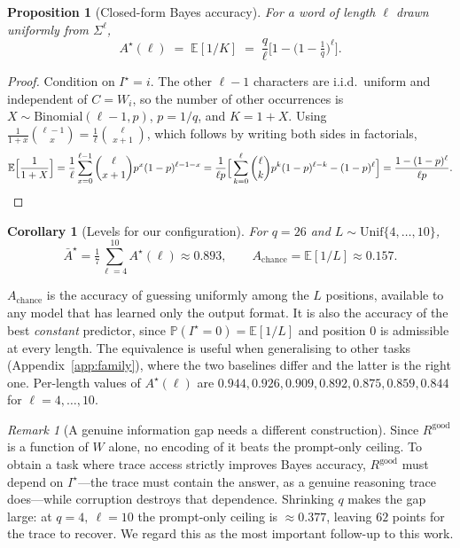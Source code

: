 \documentclass{article}
\theoremstyle{plain}
\newtheorem{proposition}{Proposition}
\newtheorem{corollary}{Corollary}
\theoremstyle{definition}
\theoremstyle{remark}
\newtheorem{remark}{Remark}
\newcommand{\E}{\mathbb{E}}
\newcommand{\Prob}{\mathbb{P}}
\newcommand{\1}{\mathbf{1}}
\newcommand{\good}{\mathrm{good}}
\begin{document}
\begin{proposition}[Closed-form Bayes accuracy]
\label{prop:bayesacc}
For a word of length $\ell$ drawn uniformly from $\Sigma^\ell$,
\begin{equation}
\label{eq:bayesacc}
A^\star(\ell) \;=\; \E[1/K] \;=\; \frac{q}{\ell}\Big[1 - \big(1-\tfrac1q\big)^{\ell}\Big].
\end{equation}
\end{proposition}

\begin{proof}
Condition on $I^\star = i$. The other $\ell-1$ characters are i.i.d.\ uniform and
independent of $C = W_i$, so the number of other occurrences is
$X\sim\mathrm{Binomial}(\ell-1,p)$, $p = 1/q$, and $K = 1+X$. Using
$\frac{1}{1+x}\binom{\ell-1}{x} = \frac1\ell\binom{\ell}{x+1}$, which follows by
writing both sides in factorials,
\[
\E\Big[\frac1{1+X}\Big]
= \frac1\ell\sum_{x=0}^{\ell-1}\binom{\ell}{x+1}p^{x}(1-p)^{\ell-1-x}
= \frac{1}{\ell p}\Big[\sum_{k=0}^{\ell}\binom{\ell}{k}p^{k}(1-p)^{\ell-k} - (1-p)^\ell\Big]
= \frac{1-(1-p)^{\ell}}{\ell p}.
\qedhere
\]
\end{proof}

\begin{corollary}[Levels for our configuration]
\label{cor:levels}
For $q = 26$ and $L\sim\mathrm{Unif}\{4,\dots,10\}$,
\begin{equation}
\label{eq:levels}
\bar A^\star = \tfrac17\textstyle\sum_{\ell=4}^{10} A^\star(\ell) \approx 0.893,
\qquad
A_{\mathrm{chance}} = \E[1/L] \approx 0.157 .
\end{equation}
\end{corollary}

$A_{\mathrm{chance}}$ is the accuracy of guessing uniformly among the $L$
positions, available to any model that has learned only the output format. It is
also the accuracy of the best \emph{constant} predictor, since
$\Prob(I^\star = 0) = \E[1/L]$ and position $0$ is admissible at every length.
The equivalence is useful when generalising to other tasks
(Appendix~\ref{app:family}), where the two baselines differ and the latter is the
right one. Per-length values of $A^\star(\ell)$ are $0.944, 0.926, 0.909, 0.892,
0.875, 0.859, 0.844$ for $\ell = 4,\dots,10$.

\begin{remark}[A genuine information gap needs a different construction]
\label{rem:gap}
Since $R^{\good}$ is a function of $W$ alone, no encoding of it beats the
prompt-only ceiling. To obtain a task where trace access strictly improves Bayes
accuracy, $R^{\good}$ must depend on $I^\star$---the trace must contain the
answer, as a genuine reasoning trace does---while corruption destroys that
dependence. Shrinking $q$ makes the gap large: at $q = 4,\ \ell = 10$ the
prompt-only ceiling is $\approx0.377$, leaving $62$ points for the trace to
recover. We regard this as the most important follow-up to this work.
\end{remark}
\end{document}
